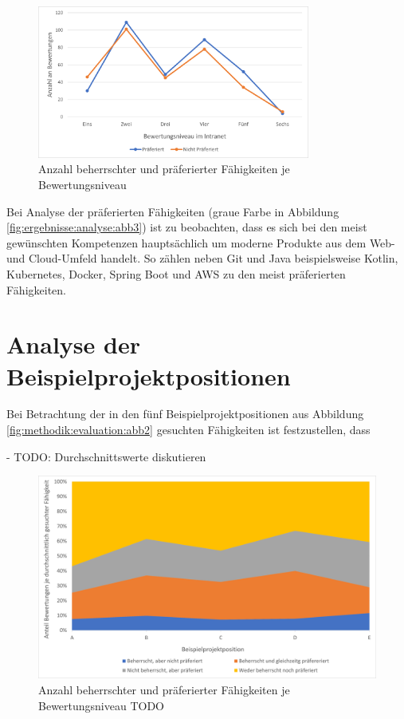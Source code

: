 \begin{figure}[h]
	\centering
	\includegraphics[width=0.8\textwidth]{gfx/bewertungen-je-bewertungsniveau.png}
	\caption{Anzahl beherrschter und präferierter Fähigkeiten je Bewertungsniveau}
	\label{fig:ergebnisse:analyse:abb4}
\end{figure}

Bei Analyse der präferierten Fähigkeiten (graue Farbe in Abbildung \ref{fig:ergebnisse:analyse:abb3}) ist zu beobachten, dass es sich bei den meist gewünschten Kompetenzen hauptsächlich um moderne Produkte aus dem Web- und Cloud-Umfeld handelt. So zählen neben Git und Java beispielsweise Kotlin, Kubernetes, Docker, Spring Boot und AWS zu den meist präferierten Fähigkeiten.

\section{Analyse der Beispielprojektpositionen}
\label{ch:ergebnisse:projekte}
Bei Betrachtung der in den fünf Beispielprojektpositionen aus Abbildung \ref{fig:methodik:evaluation:abb2} gesuchten Fähigkeiten ist festzustellen, dass 

- TODO: Durchschnittswerte diskutieren

\begin{figure}[h]
	\centering
	\includegraphics[width=1\textwidth]{gfx/anteil-bewertungen-je-projektposition.png}
	\caption{Anzahl beherrschter und präferierter Fähigkeiten je Bewertungsniveau TODO}
	\label{fig:ergebnisse:analyse:abb5}
\end{figure}

